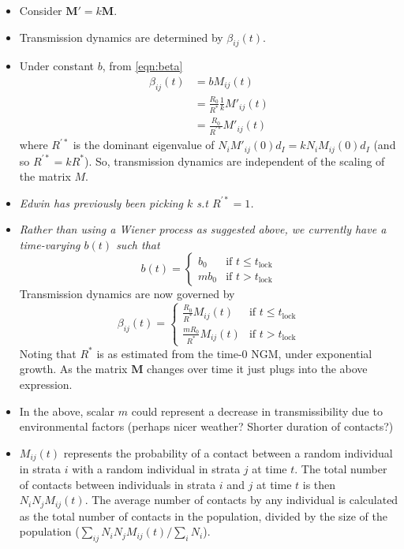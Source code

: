 \documentclass{article}
\renewcommand{\vec}[1]{\boldsymbol{{#1}}}
\begin{document}
\begin{itemize}
\item Consider $\vec{M}' = k\vec{M}$.
\item Transmission dynamics are determined by $\beta_{ij}(t)$.
\item Under constant $b$, from \eqref{eqn:beta}
  \begin{align*}
    \beta_{ij}(t) &= b M_{ij}(t)\\
    &= \frac{R_0}{R^*} \frac{1}{k} M'_{ij}(t)\\
    &= \frac{R_0}{R^{'*}} M'_{ij}(t)
  \end{align*}
  where $R^{'*}$ is the dominant eigenvalue of $N_i M'_{ij}(0) d_I = k N_i M_{ij}(0) d_I$ (and so $R^{'*} = kR^*$). So, transmission dynamics are independent of the scaling of the matrix $M$.
\item {\it Edwin has previously been picking $k$ s.t $R^{'*} = 1$.}
\item {\it Rather than using a Wiener process as suggested above, we currently have a time-varying $b(t)$ such that}
  \begin{equation*}
    b(t) = \begin{cases} b_0 & \text{if $t \leq t_{\textrm{lock}}$} \\
    m b_0 & \text{if $t > t_{\textrm{lock}}$}\end{cases}
  \end{equation*}
  Transmission dynamics are now governed by
  \begin{equation*}
    \beta_{ij}(t) = \begin{cases} \frac{R_0}{R^*}M_{ij}(t) & \text{if $t \leq t_{\textrm{lock}}$} \\
    \frac{mR_0}{R^*}M_{ij}(t) & \text{if $t > t_{\textrm{lock}}$}\end{cases}
  \end{equation*}
  Noting that $R^*$ is as estimated from the time-0 NGM, under exponential growth. As the matrix $\vec{M}$ changes over time it just plugs into the above expression.
\item In the above, scalar $m$ could represent a decrease in transmissibility due to environmental factors (perhaps nicer weather? Shorter duration of contacts?)
\item {$M_{ij}(t)$ represents the probability of a contact between a random individual in strata $i$ with a random individual in strata $j$ at time $t$. The total number of contacts between individuals in strata $i$ and $j$ at time $t$ is then  $N_iN_jM_{ij}(t)$. The average number of contacts by any individual is calculated as the total number of contacts in the population, divided by the size of the population ($\sum_{ij}N_iN_jM_{ij}(t)/\sum_iN_i$).}
\end{itemize}
\end{document}
